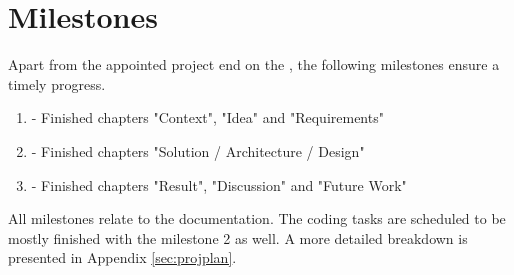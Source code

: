 \section{Milestones}

Apart from the appointed project end on the , the following milestones ensure a timely progress.

\begin{enumerate}
\item \textbf{} - Finished chapters "Context", "Idea" and "Requirements"
\item \textbf{} - Finished chapters "Solution / Architecture / Design"
\item \textbf{} - Finished chapters "Result", "Discussion" and "Future Work"
\end{enumerate}

All milestones relate to the documentation. The coding tasks are scheduled to be mostly finished with the milestone 2 as well. A more detailed breakdown is presented in Appendix \ref{sec:projplan}.